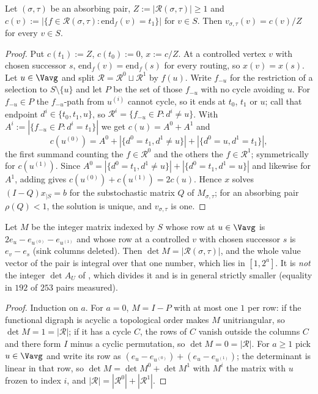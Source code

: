 \begin{theorem}\label{fresh19:thm-routing}
Let $(\sigma,\tau)$ be an absorbing pair, $Z:=|\mathcal R(\sigma,\tau)|\ge1$ and
$c(v):=|\{f\in\mathcal R(\sigma,\tau):\mathrm{end}_f(v)=t_1\}|$ for $v\in S$.
Then $v_{\sigma,\tau}(v)=c(v)/Z$ for every $v\in S$.
\end{theorem}

\begin{proof}
Put $c(t_1):=Z$, $c(t_0):=0$, $x:=c/Z$.  At a controlled vertex $v$ with chosen
successor $s$, $\mathrm{end}_f(v)=\mathrm{end}_f(s)$ for every routing, so
$x(v)=x(s)$.  Let $u\in\Vavg$ and split
$\mathcal R=\mathcal R^0\sqcup\mathcal R^1$ by $f(u)$.  Write $f_{-u}$ for the
restriction of a selection to $S\setminus\{u\}$ and let $P$ be the set of those
$f_{-u}$ with no cycle avoiding $u$.  For $f_{-u}\in P$ the $f_{-u}$-path from
$u^{(i)}$ cannot cycle, so it ends at $t_0$, $t_1$ or $u$; call that endpoint
$d^{i}\in\{t_0,t_1,u\}$, so $\mathcal R^{i}=\{f_{-u}\in P:d^{i}\ne u\}$.  With
$A^{i}:=|\{f_{-u}\in P:d^{i}=t_1\}|$ we get $c(u)=A^{0}+A^{1}$ and
\[
  c(u^{(0)})=A^{0}+|\{d^{0}=t_1,d^{1}\ne u\}|+|\{d^{0}=u,d^{1}=t_1\}|,
\]
the first summand counting the $f\in\mathcal R^{0}$ and the others the
$f\in\mathcal R^{1}$; symmetrically for $c(u^{(1)})$.  Since
$A^{0}=|\{d^{0}=t_1,d^{1}\ne u\}|+|\{d^{0}=t_1,d^{1}=u\}|$ and likewise for
$A^{1}$, adding gives $c(u^{(0)})+c(u^{(1)})=2c(u)$.  Hence $x$ solves
$(I-Q)x_{|S}=b$ for the substochastic matrix $Q$ of $M_{\sigma,\tau}$; for an
absorbing pair $\rho(Q)<1$, the solution is unique, and $v_{\sigma,\tau}$ is one.
\end{proof}

\begin{corollary}\label{fresh19:cor-den}
Let $M$ be the integer matrix indexed by $S$ whose row at $u\in\Vavg$ is
$2e_u-e_{u^{(0)}}-e_{u^{(1)}}$ and whose row at a controlled $v$ with chosen
successor $s$ is $e_v-e_s$ (sink columns deleted).  Then
$\det M=|\mathcal R(\sigma,\tau)|$, and the whole value vector of the pair is
integral over that one number, which lies in $[1,2^{a}]$.  It is \emph{not} the
integer $\det A_U$ of , which divides it and is in
general strictly smaller (equality in $192$ of $253$ pairs measured).
\end{corollary}

\begin{proof}
Induction on $a$.  For $a=0$, $M=I-P$ with at most one $1$ per row: if the
functional digraph is acyclic a topological order makes $M$ unitriangular, so
$\det M=1=|\mathcal R|$; if it has a cycle $C$, the rows of $C$ vanish outside
the columns $C$ and there form $I$ minus a cyclic permutation, so
$\det M=0=|\mathcal R|$.  For $a\ge1$ pick $u\in\Vavg$ and write its row as
$(e_u-e_{u^{(0)}})+(e_u-e_{u^{(1)}})$; the determinant is linear in that row, so
$\det M=\det M^{0}+\det M^{1}$ with $M^{i}$ the matrix with $u$ frozen to index
$i$, and $|\mathcal R|=|\mathcal R^{0}|+|\mathcal R^{1}|$.
\end{proof}

